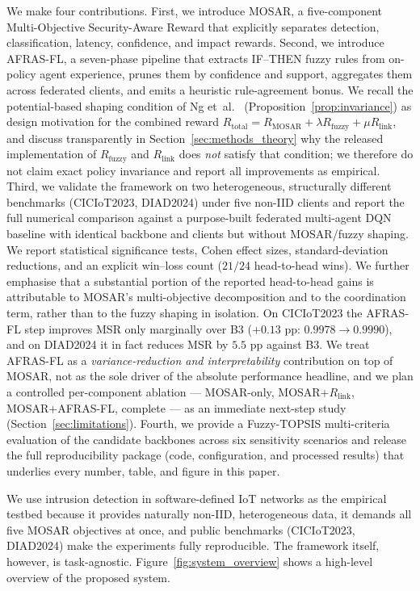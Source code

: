 \documentclass[ai,article,submit,moreauthors,pdftex]{Definitions/mdpi}
\newcommand{\rev}[1]{#1}
\begin{document}
We make four contributions. First, we introduce MOSAR, a five-component
Multi-Objective Security-Aware Reward that explicitly separates detection,
classification, latency, confidence, and impact rewards. Second, we
introduce AFRAS-FL, a seven-phase pipeline that extracts IF--THEN fuzzy
rules from on-policy agent experience, prunes them by confidence and
support, aggregates them across federated clients, and emits a
\rev{heuristic rule-agreement bonus.} \rev{We recall the potential-based shaping condition of Ng et~al.~\cite{ng1999policy_invariance} (Proposition~\ref{prop:invariance}) as design motivation for the combined reward
$R_{\text{total}} = R_{\text{MOSAR}} + \lambda R_{\text{fuzzy}} + \mu
R_{\text{link}}$, and discuss transparently in Section~\ref{sec:methods_theory} why the released implementation of $R_{\text{fuzzy}}$ and $R_{\text{link}}$ does \emph{not} satisfy that condition; we therefore do not claim exact policy invariance and report all improvements as empirical.}
Third, we validate the framework on two heterogeneous, structurally
different benchmarks (CICIoT2023, DIAD2024) under five non-IID clients
and report the full numerical comparison against a purpose-built
federated multi-agent DQN baseline with identical backbone and clients
but without MOSAR/fuzzy shaping. We report statistical significance
tests, Cohen effect sizes, standard-deviation reductions, and an
explicit win--loss count ($21/24$ head-to-head wins). \rev{We further emphasise that a substantial portion of the reported head-to-head gains is attributable to MOSAR's multi-objective decomposition and to the coordination term, rather than to the fuzzy shaping in isolation. On CICIoT2023 the AFRAS-FL step improves MSR only marginally over B3 ($+0.13$ pp: $0.9978 \to 0.9990$), and on DIAD2024 it in fact reduces MSR by $5.5$ pp against B3. We treat AFRAS-FL as a \emph{variance-reduction and interpretability} contribution on top of MOSAR, not as the sole driver of the absolute performance headline, and we plan a controlled per-component ablation --- MOSAR-only, MOSAR+$R_{\text{link}}$, MOSAR+AFRAS-FL, complete --- as an immediate next-step study (Section~\ref{sec:limitations}).} Fourth, we provide
a Fuzzy-TOPSIS multi-criteria evaluation of the candidate backbones
across six sensitivity scenarios and release the full reproducibility
package (code, configuration, and processed results) that underlies
every number, table, and figure in this paper.

We use intrusion detection in software-defined IoT networks as the
empirical testbed because it provides naturally non-IID, heterogeneous
data, it demands all five MOSAR objectives at once, and public benchmarks
(CICIoT2023\cite{ciciot2023}, DIAD2024\cite{diad2024}) make the
experiments fully reproducible. The framework itself, however, is
task-agnostic. Figure~\ref{fig:system_overview} shows a high-level
overview of the proposed system.
\end{document}
